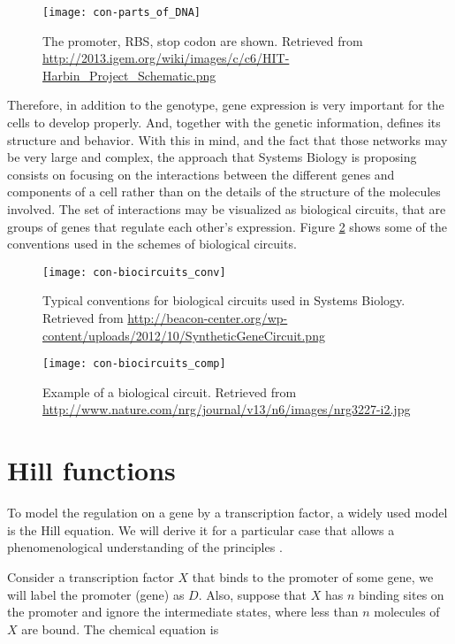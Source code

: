 \begin{figure}[H]
  \centering
  \texttt{[image: con-parts\_of\_DNA]}
  \caption[Parts of a gene]{\label{fig:con-parts_of_DNA} The promoter, RBS, stop codon are shown. Retrieved from \url{http://2013.igem.org/wiki/images/c/c6/HIT-Harbin_Project_Schematic.png}}
\end{figure}

Therefore, in addition to the genotype, gene expression is very important for the cells to develop properly. And, together with the genetic information, defines its structure and behavior. With this in mind, and the fact that those networks may be very large and complex, the approach that Systems Biology is proposing consists on focusing on the interactions between the different genes and components of a cell rather than on the details of the structure of the molecules involved. The set of interactions may be visualized as biological circuits, that are groups of genes that regulate each other's expression. Figure \ref{fig:con-biocircuits_conv} shows some of the conventions used in the schemes of biological circuits.

\begin{figure}[H]
  \centering
  \texttt{[image: con-biocircuits\_conv]}
  \caption[Systems biology conventions]{\label{fig:con-biocircuits_conv} Typical conventions for biological circuits used in Systems Biology. Retrieved from \url{http://beacon-center.org/wp-content/uploads/2012/10/SyntheticGeneCircuit.png}}
\end{figure}

\begin{figure}[H]
  \centering
  \texttt{[image: con-biocircuits\_comp]}
  \caption[Example of a biological circuit]{\label{fig:con-biocircuits_comp} Example of a biological circuit. Retrieved from \url{http://www.nature.com/nrg/journal/v13/n6/images/nrg3227-i2.jpg}}
\end{figure}

\section{Hill functions}

To model the regulation on a gene by a transcription factor, a widely used model is the Hill equation. We will derive it for a particular case that allows a phenomenological understanding of the principles \cite{alon06}.

Consider a transcription factor $X$ that binds to the promoter of some gene, we will label the promoter (gene) as $D$. Also, suppose that $X$ has $n$ binding sites on the promoter and ignore the intermediate states, where less than $n$ molecules of $X$ are bound. The chemical equation is

